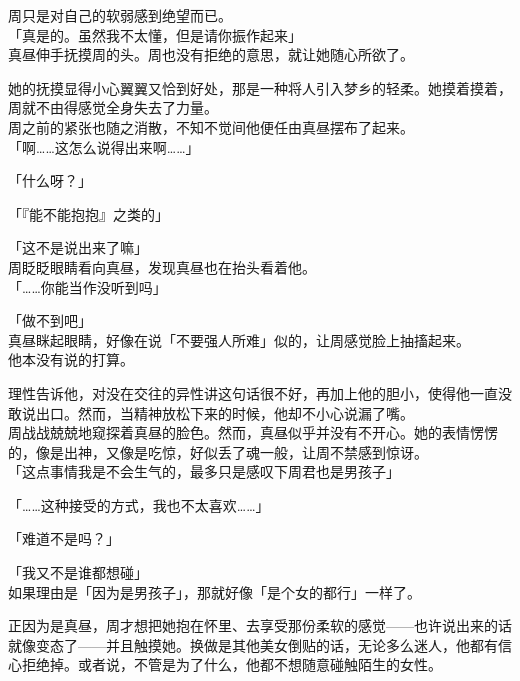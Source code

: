 周只是对自己的软弱感到绝望而已。\\

「真是的。虽然我不太懂，但是请你振作起来」\\

真昼伸手抚摸周的头。周也没有拒绝的意思，就让她随心所欲了。

她的抚摸显得小心翼翼又恰到好处，那是一种将人引入梦乡的轻柔。她摸着摸着，周就不由得感觉全身失去了力量。\\

周之前的紧张也随之消散，不知不觉间他便任由真昼摆布了起来。\\

「啊……这怎么说得出来啊……」

「什么呀？」

「『能不能抱抱』之类的」

「这不是说出来了嘛」\\

周眨眨眼睛看向真昼，发现真昼也在抬头看着他。\\

「……你能当作没听到吗」

「做不到吧」\\

真昼眯起眼睛，好像在说「不要强人所难」似的，让周感觉脸上抽搐起来。\\

他本没有说的打算。

理性告诉他，对没在交往的异性讲这句话很不好，再加上他的胆小，使得他一直没敢说出口。然而，当精神放松下来的时候，他却不小心说漏了嘴。\\

周战战兢兢地窥探着真昼的脸色。然而，真昼似乎并没有不开心。她的表情愣愣的，像是出神，又像是吃惊，好似丢了魂一般，让周不禁感到惊讶。\\

「这点事情我是不会生气的，最多只是感叹下周君也是男孩子」

「……这种接受的方式，我也不太喜欢……」

「难道不是吗？」

「我又不是谁都想碰」\\

如果理由是「因为是男孩子」，那就好像「是个女的都行」一样了。

正因为是真昼，周才想把她抱在怀里、去享受那份柔软的感觉——也许说出来的话就像变态了——并且触摸她。换做是其他美女倒贴的话，无论多么迷人，他都有信心拒绝掉。或者说，不管是为了什么，他都不想随意碰触陌生的女性。\\

